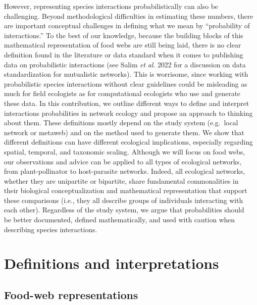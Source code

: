 \documentclass[10pt,oneside]{article}
\begin{document}
However, representing species interactions probabilistically can also be
challenging. Beyond methodological difficulties in estimating these
numbers, there are important conceptual challenges in defining what we
mean by ``probability of interactions.'' To the best of our knowledge,
because the building blocks of this mathematical representation of food
webs are still being laid, there is no clear definition found in the
literature or data standard when it comes to publishing data on
probabilistic interactions (see Salim \emph{et al.} 2022 for a
discussion on data standardization for mutualistic networks). This is
worrisome, since working with probabilistic species interactions without
clear guidelines could be misleading as much for field ecologists as for
computational ecologists who use and generate these data. In this
contribution, we outline different ways to define and interpret
interactions probabilities in network ecology and propose an approach to
thinking about them. These definitions mostly depend on the study system
(e.g.~local network or metaweb) and on the method used to generate them.
We show that different definitions can have different ecological
implications, especially regarding spatial, temporal, and taxonomic
scaling. Although we will focus on food webs, our observations and
advice can be applied to all types of ecological networks, from
plant-pollinator to host-parasite networks. Indeed, all ecological
networks, whether they are unipartite or bipartite, share fundamental
commonalities in their biological conceptualization and mathematical
representation that support these comparisons (i.e., they all describe
groups of individuals interacting with each other). Regardless of the
study system, we argue that probabilities should be better documented,
defined mathematically, and used with caution when describing species
interactions.

\hypertarget{definitions-and-interpretations}{%
\section{Definitions and
interpretations}\label{definitions-and-interpretations}}

\hypertarget{food-web-representations}{%
\subsection{Food-web representations}\label{food-web-representations}}
\end{document}
